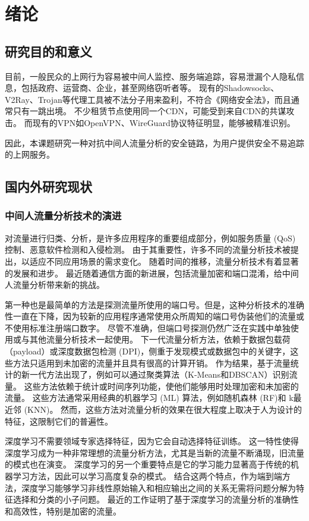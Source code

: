 
\chapter{绪论}
\section{研究目的和意义}
目前，一般民众的上网行为容易被中间人监控、服务端追踪，容易泄漏个人隐私信息，包括政府、运营商、企业，甚至网络窃听者等。
现有的Shadowsocks、V2Ray、Trojan等代理工具被不法分子用来盈利，不符合《网络安全法》，而且通常只有一跳出境。
不少租赁节点使用同一个CDN，可能受到来自CDN的共谋攻击。
而现有的VPN如OpenVPN\cite{feilner2006openvpn}、WireGuard\cite{donenfeld2017wireguard}协议特征明显，能够被精准识别。

因此，本课题研究一种对抗中间人流量分析的安全链路，为用户提供安全不易追踪的上网服务。

\section{国内外研究现状}
\subsection{中间人流量分析技术的演进}
对流量进行归类、分析，是许多应用程序的重要组成部分，例如服务质量 (QoS) 控制、恶意软件检测和入侵检测。
由于其重要性，许多不同的流量分析技术被提出，以适应不同应用场景的需求变化。
随着时间的推移，流量分析技术有着显著的发展和进步。
最近随着通信方面的新进展，包括流量加密和端口混淆，给中间人流量分析带来新的挑战。

第一种也是最简单的方法是探测流量所使用的端口号。但是，这种分析技术的准确性一直在下降，因为较新的应用程序通常使用众所周知的端口号伪装他们的流量或不使用标准注册端口数字。
尽管不准确，但端口号探测仍然广泛在实践中单独使用或与其他流量分析技术一起使用。
下一代流量分析方法，依赖于数据包载荷（payload）或深度数据包检测 (DPI)，侧重于发现模式或数据包中的关键字，这些方法只适用到未加密的流量并且具有很高的计算开销。
作为结果，基于流量统计的新一代方法出现了，例如可以通过聚类算法（K-Means和DBSCAN\cite{ester1996density}）识别流量\cite{erman2006traffic}。
这些方法依赖于统计或时间序列功能，使他们能够用时处理加密和未加密的流量。
这些方法通常采用经典的机器学习 (ML) 算法，例如随机森林 (RF)和 k最近邻 (KNN)\cite{altman1992introduction}。
然而，这些方法对流量分析的效果在很大程度上取决于人为设计的特征，这限制它们的普遍性。

深度学习不需要领域专家选择特征，因为它会自动选择特征训练。
这一特性使得深度学习成为一种非常理想的流量分析方法，尤其是当新的流量不断涌现，旧流量的模式也在演变。
深度学习的另一个重要特点是它的学习能力显著高于传统的机器学习方法，因此可以学习高度复杂的模式。
结合这两个特点，作为端到端方法，深度学习能够学习非线性原始输入和相应输出之间的关系无需将问题分解为特征选择和分类的小子问题。
最近的工作证明了基于深度学习的流量分析的准确性和高效性，特别是加密的流量\cite{rezaei2019deep}。

